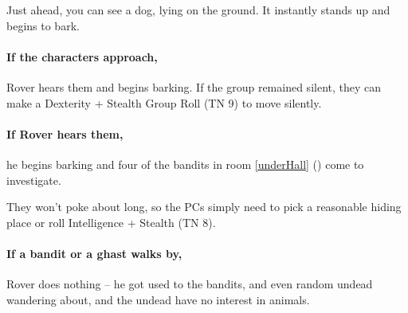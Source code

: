 \begin{multicols}{2}
\begin{boxtext}
  Just ahead, you can see a dog, lying on the ground.
  It instantly stands up and begins to bark.

\end{boxtext}

\paragraph{If the characters approach,}
Rover hears them and begins barking.
If the group remained silent, they can make a Dexterity + Stealth Group Roll (TN 9) to move silently.

\paragraph{If Rover hears them,}
he begins barking and four of the bandits in room \ref{underHall} () come to investigate.

They won't poke about long, so the PCs simply need to pick a reasonable hiding place or roll Intelligence + Stealth (TN 8).

\paragraph{If a bandit or a ghast walks by,}
Rover does nothing -- he got used to the bandits, and even random undead wandering about, and the undead have no interest in animals.


\vfill\null

\end{multicols}
